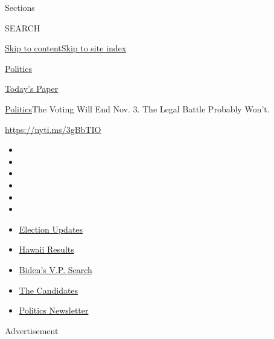 Sections

SEARCH

\protect\hyperlink{site-content}{Skip to
content}\protect\hyperlink{site-index}{Skip to site index}

\href{https://www.nytimes.com/section/politics}{Politics}

\href{https://myaccount.nytimes.com/auth/login?response_type=cookie\&client_id=vi}{}

\href{https://www.nytimes.com/section/todayspaper}{Today's Paper}

\href{/section/politics}{Politics}\textbar{}The Voting Will End Nov. 3.
The Legal Battle Probably Won't.

\href{https://nyti.ms/3gBbTIO}{https://nyti.ms/3gBbTIO}

\begin{itemize}
\item
\item
\item
\item
\item
\item
\end{itemize}

\begin{itemize}
\item
  \href{https://www.nytimes.com/2020/08/07/us/elections/biden-vs-trump.html?action=click\&pgtype=Article\&state=default\&region=TOP_BANNER\&context=storylines_menu}{Election
  Updates}
\item
  \href{https://www.nytimes.com/interactive/2020/08/08/us/elections/results-hawaii-primary-elections.html?action=click\&pgtype=Article\&state=default\&region=TOP_BANNER\&context=storylines_menu}{Hawaii
  Results}
\item
  \href{https://www.nytimes.com/article/biden-vice-president-2020.html?action=click\&pgtype=Article\&state=default\&region=TOP_BANNER\&context=storylines_menu}{Biden's
  V.P. Search}
\item
  \href{https://www.nytimes.com/interactive/2019/us/politics/2020-presidential-candidates.html?action=click\&pgtype=Article\&state=default\&region=TOP_BANNER\&context=storylines_menu}{The
  Candidates}
\item
  \href{https://www.nytimes.com/newsletters/politics?action=click\&pgtype=Article\&state=default\&region=TOP_BANNER\&context=storylines_menu}{Politics
  Newsletter}
\end{itemize}

Advertisement

